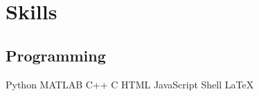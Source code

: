 \documentclass[letterpaper]{deedy-resume} %
\begin{document}
{\begin{minipage}[t]{0.33\textwidth}



%
%
%
%
%
%
%


\sectionspace %
\section{Skills}

\subsection{Programming}

Python \textbullet{} MATLAB \textbullet{} C++ \textbullet{} C \textbullet{} 
 HTML \textbullet{} JavaScript \textbullet{} Shell \textbullet{} LaTeX \\


\end{minipage}}
\end{document}
